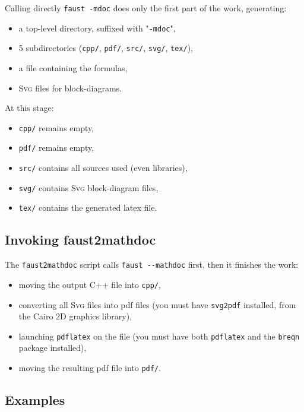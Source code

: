 \documentclass[a4paper]{book}
\begin{document}
Calling directly \lstinline!faust -mdoc! does only the first part of the work, generating:
\begin{itemize}
\item a top-level directory, suffixed with "\texttt{-mdoc}",
\item 5 subdirectories (\lstinline!cpp/!, \lstinline!pdf/!, \lstinline!src/!, \lstinline!svg/!, \lstinline!tex/!),
\item a \latex file containing the formulas,
\item \textsc{Svg} files for block-diagrams.
\end{itemize}

At this stage:
\begin{itemize}
\item \lstinline!cpp/! remains empty,
\item \lstinline!pdf/! remains empty,
\item \lstinline!src/! contains all \faust sources used (even libraries),
\item \lstinline!svg/! contains \textsc{Svg} block-diagram files,
\item \lstinline!tex/! contains the generated latex file.
\end{itemize}

\subsection{Invoking faust2mathdoc}
\label{sec:invok-faust2m}

The \lstinline!faust2mathdoc! script calls \lstinline!faust --mathdoc! first, then it finishes the work:
\begin{itemize}
\item moving the output C++ file into \lstinline!cpp/!,
\item converting all \textsc{Svg} files into pdf files (you must have \lstinline!svg2pdf! installed, from the Cairo 2D graphics library),
\item launching \lstinline!pdflatex! on the \latex file (you must have both \lstinline!pdflatex! and the \lstinline!breqn! package installed),
\item moving the resulting pdf file into \lstinline!pdf/!.
\end{itemize}

\subsection{Examples}
\label{sec:mdoc-examples}
\end{document}
